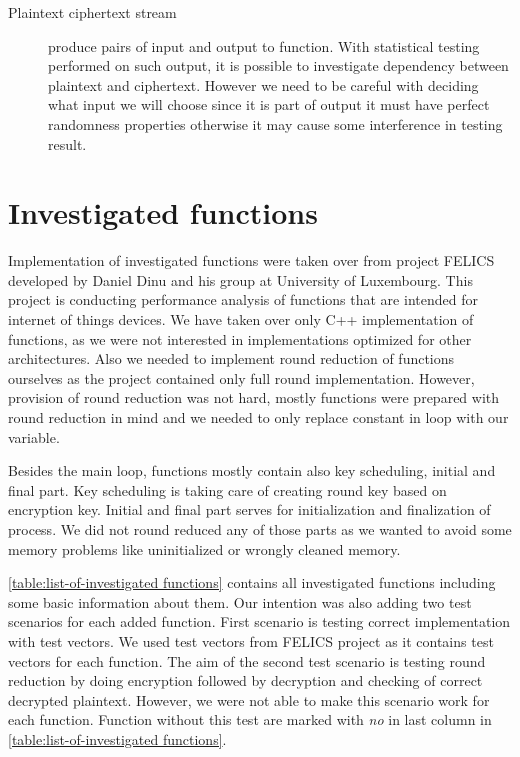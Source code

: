 \documentclass[
    digital,    %
    oneside,    %
    color,
    11pt,
    nocover,
    notable,
    nolof,
    nolot,
    final
]{fithesis3}
\begin{document}
\begin{description}
	\item[Plaintext ciphertext stream] produce pairs of input and output to function. With statistical testing performed on such output, it is possible to investigate dependency between plaintext and ciphertext. However we need to be careful with deciding what input we will choose since it is part of output it must have perfect randomness properties otherwise it may cause some interference in testing result.

\end{description}

\section{Investigated functions}

Implementation of investigated functions were taken over from project FELICS~\cite{dinu2015felics} developed by Daniel Dinu and his group at University of Luxembourg. This project is conducting performance analysis of functions that are intended for internet of things devices. We have taken over only C++ implementation of functions, as we were not interested in implementations optimized for other architectures. Also we needed to implement round reduction of functions ourselves as the project contained only full round implementation. However, provision of round reduction was not hard, mostly functions were prepared with round reduction in mind and we needed to only replace constant in loop with our variable. 

Besides the main loop, functions mostly contain also key scheduling, initial and final part. Key scheduling is taking care of creating round key based on encryption key. Initial and final part serves for initialization and finalization of process. We did not round reduced any of those parts as we wanted to avoid some memory problems like uninitialized or wrongly cleaned memory.

\cref{table:list-of-investigated functions} contains all investigated functions including some basic information about them. Our intention was also adding two test scenarios for each added function. First scenario is testing correct implementation with test vectors. We used test vectors from FELICS project as it contains test vectors for each function. The aim of the second test scenario is testing round reduction by doing encryption followed by decryption and checking of correct decrypted plaintext. However, we were not able to make this scenario work for each function. Function without this test are marked with \textit{no} in last column in \cref{table:list-of-investigated functions}.
\end{document}
